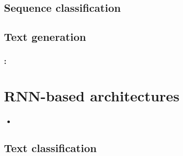 \documentclass[xcolor=table]{beamer}
\begin{document}
\subsection{Sequence classification}


\subsection{Text generation}

\begin{frame}
	\frametitle{\insertshortsubtitle: \insertsection}
	\framesubtitle{\insertsubsection}
	
\end{frame}


\section{RNN-based architectures}

\begin{frame}
	\frametitle{\insertshortsubtitle}
	\framesubtitle{\insertsection}
	
	\begin{itemize}
		\item 
	\end{itemize}
	
\end{frame}

\subsection{Text classification}
\end{document}
